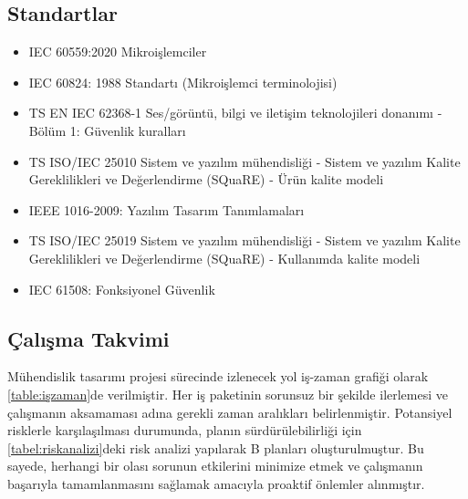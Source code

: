 \subsection{Standartlar}

\begin{comment}
Yapılan çalışmada uyulması gereken ve uyulan standartlar numaraları ve
standart adları ile bu ayrıtta sıralanmalıdır. Örneğin X konusunda
standartlar gerekiyorsa Google tarama motoruna ``Standards in X''
yazıldığında o konu ile ilgili çok sayıda standart karşınıza çıkacaktır.
Bunları inceleyip uygun olanlarını burada sıralayınız. Özellikle TSE,
IEC ve IEEE standartlarını araştırınız.
\end{comment}

\begin{itemize}
    \item IEC 60559:2020 Mikroişlemciler \cite{IEC_60559_2020}
    \item IEC 60824: 1988 Standartı (Mikroişlemci terminolojisi) \cite{IEC_60824_1988}
    \item TS EN IEC 62368-1 Ses/görüntü, bilgi ve iletişim teknolojileri donanımı - Bölüm 1: Güvenlik kuralları \cite{TS_EN_IEC_62368_1}
    \item TS ISO/IEC 25010 	Sistem ve yazılım mühendisliği - Sistem ve yazılım Kalite Gereklilikleri ve Değerlendirme (SQuaRE) - Ürün kalite modeli \cite{TS_ISO_IEC_25010}
    \item IEEE 1016-2009: Yazılım Tasarım Tanımlamaları \cite{IEEE_1016_2009}
    \item 	TS ISO/IEC 25019 Sistem ve yazılım mühendisliği - Sistem ve yazılım Kalite Gereklilikleri ve Değerlendirme (SQuaRE) - Kullanımda kalite modeli \cite{TS_ISO_IEC_25019}
    \item IEC 61508: Fonksiyonel Güvenlik \cite{IEC_61508}
\end{itemize}

\subsection{Çalışma Takvimi}

Mühendislik tasarımı projesi sürecinde izlenecek yol iş-zaman grafiği
olarak \ref{table:işzaman}de verilmiştir. Her iş paketinin sorunsuz bir şekilde ilerlemesi ve çalışmanın aksamaması adına gerekli zaman aralıkları belirlenmiştir.
Potansiyel risklerle karşılaşılması durumunda, planın sürdürülebilirliği için \ref{tabel:riskanalizi}deki risk analizi yapılarak B planları oluşturulmuştur. Bu sayede, herhangi bir olası sorunun etkilerini minimize etmek ve çalışmanın başarıyla tamamlanmasını sağlamak amacıyla
proaktif önlemler alınmıştır. 

